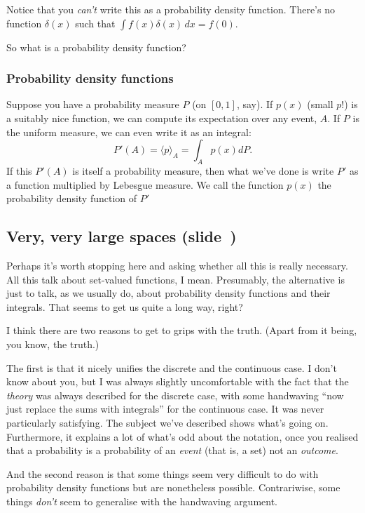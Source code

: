 \documentclass[11pt]{article}
\begin{document}
Notice that you \emph{can't} write this as a probability density
function. There's no function $\delta(x)$ such that $\int f(x)\delta(x)\,dx = f(0)$.

So what is a probability density function?

\subsubsection*{Probability density functions}

Suppose you have a probability measure $P$ (on $[0,1]$, say). If $p(x)$ (small
$p$!) is a suitably nice function, we can compute its expectation over any
event, $A$. If $P$ is the uniform measure, we can even write it as an integral:
\[
P'(A) = \langle p\rangle_A = \int_A p(x) dP.
\]
If this $P'(A)$ is itself a probability measure, then what we've done is write
$P'$ as a function multiplied by Lebesgue measure. We call the function $p(x)$
the probability density function of $P'$



\newpage
\subsection*{Very, very large spaces (slide~\pageref{slide:largespaces})}

Perhaps it's worth stopping here and asking whether all this is really
necessary. All this talk about set-valued functions, I mean. Presumably, the
alternative is just to talk, as we usually do, about probability density
functions and their integrals. That seems to get us quite a long way, right?

I think there are two reasons to get to grips with the truth. (Apart from it
being, you know, the truth.)

The first is that it nicely unifies the discrete and the continuous case. I
don't know about you, but I was always slightly uncomfortable with the fact that
the \emph{theory} was always described for the discrete case, with some
handwaving ``now just replace the sums with integrals'' for the continuous
case. It was never particularly satisfying. The subject we've described shows
what's going on. Furthermore, it explains a lot of what's odd about the
notation, once you realised that a probability is a probability of an
\emph{event} (that is, a set) not an \emph{outcome}.

And the second reason is that some things seem very difficult to do with
probability density functions but are nonetheless possible. Contrariwise, some
things \emph{don't} seem to generalise with the handwaving argument.
\end{document}
